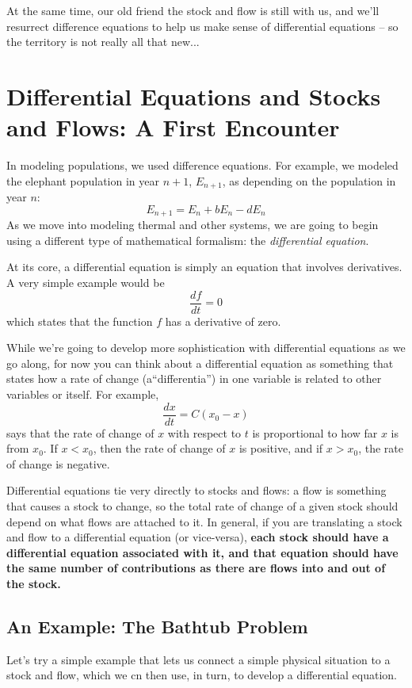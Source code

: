 At the same time, our old friend the stock and flow is still with us, and we'll resurrect difference equations to help us make sense of differential equations -- so the territory is not really all that new...

\section{Differential Equations and Stocks and Flows: A First Encounter}

In modeling populations, we used difference equations.  For example, we modeled the elephant population in year $n+1$, $E_{n+1}$, as depending on the population in year $n$:
$$E_{n+1} = E_n + bE_n - d E_n$$
As we move into modeling thermal and other systems, we are going to begin using a different type of mathematical formalism:  the {\it differential equation}.

At its core, a differential equation is simply an equation that involves derivatives.  A very simple example would be
$$\frac{df}{dt} = 0$$
which states that the function $f$ has a derivative of zero.

While we're going to develop more sophistication with differential equations as we go along, for now you can think about a differential equation as something that states how a rate of change (a``differentia'') in one variable is related to other variables or itself.  For example, 
$$\frac{dx}{dt} = C(x_0-x)$$
says that the rate of change of  $x$ with respect to $t$ is proportional to how far $x$ is from $x_0$.  If $x<x_0$, then the rate of change of $x$ is positive, and if $x>x_0$, the rate of change is negative.  

Differential equations tie very directly to stocks and flows:  a flow is something that causes a stock to change, so the total rate of change of a given stock should depend on what flows are attached to it.  In general, if you are translating a stock and flow to a differential equation (or vice-versa), 
{\bf each stock should have a differential equation associated with it, and that equation should have the same number of contributions as there are flows into and out of the stock.}   

\subsection{An Example: The Bathtub Problem}

Let's try a simple example that lets us connect a simple physical situation to a stock and flow, which we cn then use, in turn, to develop a differential equation.

